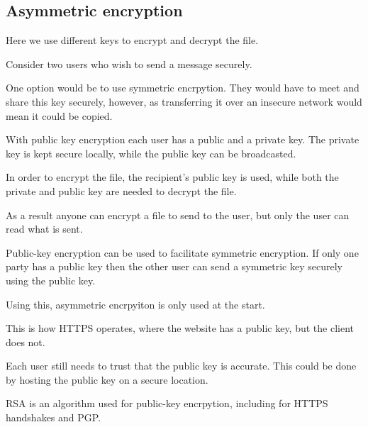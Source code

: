 
\subsection{Asymmetric encryption}

Here we use different keys to encrypt and decrypt the file.

Consider two users who wish to send a message securely.

One option would be to use symmetric encrpytion. They would have to meet and share this key securely, however, as transferring it over an insecure network would mean it could be copied.

With public key encryption each user has a public and a private key. The private key is kept secure locally, while the public key can be broadcasted.

In order to encrypt the file, the recipient's public key is used, while both the private and public key are needed to decrypt the file.

As a result anyone can encrypt a file to send to the user, but only the user can read what is sent.

Public-key encryption can be used to facilitate symmetric encryption. If only one party has a public key then the other user can send a symmetric key securely using the public key.

Using this, asymmetric encrpyiton is only used at the start.

This is how HTTPS operates, where the website has a public key, but the client does not.

Each user still needs to trust that the public key is accurate. This could be done by hosting the public key on a secure location.

RSA is an algorithm used for public-key encrpytion, including for HTTPS handshakes and PGP.

